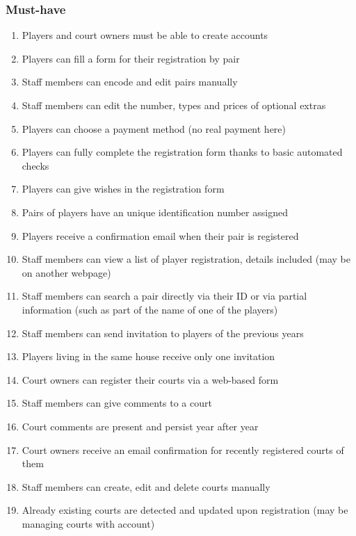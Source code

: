 \subsubsection{Must-have}

\begin{enumerate}
    \item Players and court owners must be able to create accounts
    \item Players can fill a form for their registration by pair
    \item Staff members can encode and edit pairs manually
    \item Staff members can edit the number, types and prices of
        optional extras
    \item Players can choose a payment method (no real payment here)
    \item Players can fully complete the registration form thanks to
        basic automated checks
    \item Players can give wishes in the registration form
    \item Pairs of players have an unique identification number assigned
    \item Players receive a confirmation email when their pair is
        registered
    \item Staff members can view a list of player registration, details
        included (may be on another webpage)
    \item Staff members can search a pair directly via their ID or via
        partial information (such as part of the name of one of the
        players)
    \item Staff members can send invitation to players of the previous
        years
    \item Players living in the same house receive only one invitation
    \item Court owners can register their courts via a web-based form
    \item Staff members can give comments to a court
    \item Court comments are present and persist year after year
    \item Court owners receive an email confirmation for recently
        registered courts of them
    \item Staff members can create, edit and delete courts manually
    \item Already existing courts are detected and updated upon
        registration (may be managing courts with account)

\end{enumerate}
